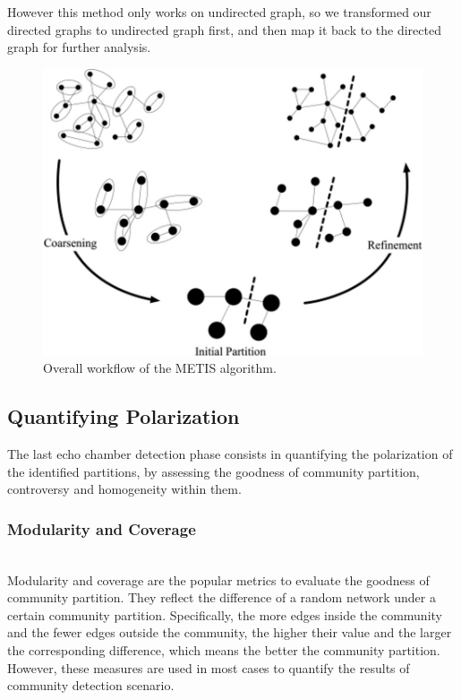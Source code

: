 \documentclass[sigplan,screen]{acmart}
\begin{document}
However this method only works on undirected graph, so we transformed our directed graphs to undirected graph first, and then map it back to the directed graph for further analysis.
\begin{figure}[h]
  \centering
  \includegraphics[width=0.85\linewidth]{resource/jiayi/metis.jpeg}
  \caption{Overall workflow of the METIS algorithm. }
\end{figure}

\subsection{Quantifying Polarization}
The last echo chamber detection phase consists in quantifying the polarization of the identified partitions, by assessing the goodness of community partition, controversy and homogeneity within them.

\subsubsection{Modularity and Coverage}
~\\
Modularity and coverage  {\cite{2004Finding}} {\cite{2009Community}} are the popular metrics to evaluate the goodness of community partition. They reflect the difference of a random network under a certain community partition. Specifically, the more edges inside the community and the fewer edges outside the community, the higher their value and the larger the corresponding difference, which means the better the community partition. However, these measures are used in most cases to quantify the results of community detection scenario. 
\end{document}

